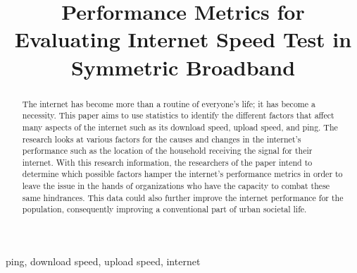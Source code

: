 \documentclass[conference]{IEEEtran}
\begin{document}
\title{Performance Metrics for Evaluating Internet Speed Test in Symmetric Broadband\\
}

\author{
\and
{}
}

\maketitle

\begin{abstract}
    The internet has become more than a routine of everyone's life; 
    it has become a necessity. This paper aims to use statistics to identify the different factors that affect many aspects of the internet such as its download speed, upload speed, and ping. 
    The research looks at various factors for the causes and changes in the internet's performance such as the location of the household receiving the signal for their internet. 
    With this research information, the researchers of the paper intend to determine which possible factors hamper the internet's performance metrics in order to leave the issue in the hands of organizations who have the capacity to combat these same hindrances. 
    This data could also further improve the internet performance for the population, consequently improving a conventional part of urban societal life.
\end{abstract}

\begin{IEEEkeywords}
ping, download speed, upload speed, internet
\end{IEEEkeywords}
\end{document}
